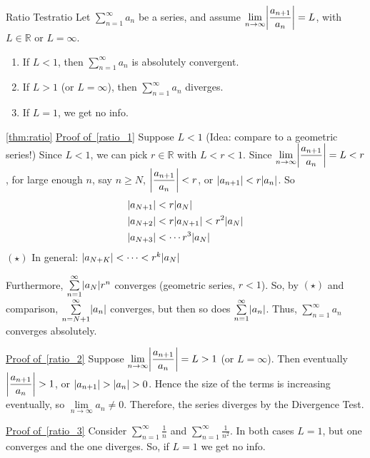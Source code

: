 \begin{Theorem}{Ratio Test}{ratio}
    Let $ \sum\limits_{n=1}^{\infty} a_n $ be a series, and assume
    $ \displaystyle \lim\limits_{{n} \to {\infty}} \abs*{\frac{a_{n+1}}{a_n} }=L $,
    with $ L\in\mathbb{R} $ or $ L=\infty $.
    \begin{enumerate}[label=(\arabic*)]
        \item\label{ratio_1} If $ L<1 $, then $ \sum\limits_{n=1}^{\infty} a_n $ is absolutely convergent.
        \item\label{ratio_2} If $ L>1 $ (or $ L=\infty $), then $ \sum\limits_{n=1}^{\infty} a_n $
              diverges.
        \item\label{ratio_3} If $ L=1 $, we get no info.
    \end{enumerate}
\end{Theorem}
\begin{Proof}{\ref{thm:ratio}}{}
    \underline{Proof of~\ref{ratio_1}} Suppose $ L<1 $ (Idea: compare to a geometric series!)
    Since $ L<1 $, we can pick $ r\in\mathbb{R} $ with $ L<r<1 $. Since
    $ \displaystyle \lim\limits_{{n} \to {\infty}} \abs*{\dfrac{a_{n+1}}{a_n}}=L<r $,
    for large enough $ n $, say $ n\geqslant N $, $ \abs*{\dfrac{a_{n+1}}{a_n} }<r $,
    or $ \abs{a_{n+1}}<r\abs{a_n} $. So
    \begin{align*}
         & \abs{a_{N+1}}<r\abs{a_N}                  \\
         & \abs{a_{N+2}}<r\abs{a_{N+1}}<r^2\abs{a_N} \\
         & \abs{a_{N+3}}<\cdots r^3\abs{a_N}
    \end{align*}
    $ (\star) $ In general: $ \abs{a_{N+K}}<\cdots<r^k\abs{a_N} $

    Furthermore, $ \sum\limits_{n=1}^{\infty} \abs{a_N}r^n $ converges (geometric series,
    $ r<1 $). So, by $ (\star) $ and comparison, $ \sum\limits_{n=N+1}^{\infty} \abs{a_n} $
    converges, but then so does $ \sum\limits_{n=1}^{\infty} \abs{a_n} $. Thus,
    $ \sum\limits_{n=1}^{\infty} a_n $ converges absolutely.

    \underline{Proof of~\ref{ratio_2}} Suppose $ \displaystyle \lim\limits_{{n} \to {\infty}} \abs*{\frac{a_{n+1}}{a_n} }=L>1 $
    (or $ L=\infty $). Then eventually $ \displaystyle \abs*{\frac{a_{n+1}}{a_n}}>1 $,
    or $ \abs{a_{n+1}}>\abs{a_n}>0 $. Hence the size of the terms is increasing eventually,
    so $ \lim\limits_{{n} \to {\infty}} a_n\neq 0 $. Therefore, the
    series diverges by the Divergence Test.

    \underline{Proof of~\ref{ratio_3}} Consider
    $ \displaystyle \sum\limits_{n=1}^{\infty} \frac{1}{n} $ and
    $ \displaystyle \sum\limits_{n=1}^{\infty}
        \frac{1}{n^2}  $. In both cases $ L=1 $, but one converges and the one diverges. So,
    if $ L=1 $ we get no info.
\end{Proof}

